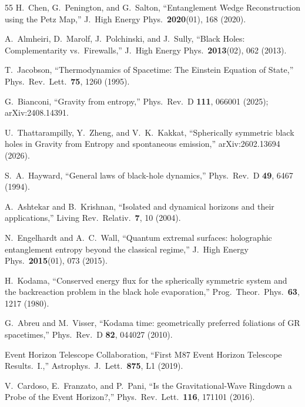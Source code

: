 \documentclass[prl,twocolumn,superscriptaddress,longbibliography,floatfix]{revtex4-2}
\begin{document}
\begin{thebibliography}{55}
H.~Chen, G.~Penington, and G.~Salton,
``Entanglement Wedge Reconstruction using the Petz Map,''
J.\ High Energy Phys.\ \textbf{2020}(01), 168 (2020).

A.~Almheiri, D.~Marolf, J.~Polchinski, and J.~Sully,
``Black Holes: Complementarity vs.\ Firewalls,''
J.\ High Energy Phys.\ \textbf{2013}(02), 062 (2013).


T.~Jacobson,
``Thermodynamics of Spacetime: The Einstein Equation of State,''
Phys.\ Rev.\ Lett.\ \textbf{75}, 1260 (1995).

G.~Bianconi,
``Gravity from entropy,''
Phys.\ Rev.\ D \textbf{111}, 066001 (2025);
arXiv:2408.14391.

U.~Thattarampilly, Y.~Zheng, and V.~K.~Kakkat,
``Spherically symmetric black holes in Gravity from Entropy
and spontaneous emission,''
arXiv:2602.13694 (2026).


S.~A.~Hayward,
``General laws of black-hole dynamics,''
Phys.\ Rev.\ D \textbf{49}, 6467 (1994).

A.~Ashtekar and B.~Krishnan,
``Isolated and dynamical horizons and their applications,''
Living Rev.\ Relativ.\ \textbf{7}, 10 (2004).

N.~Engelhardt and A.~C.~Wall,
``Quantum extremal surfaces: holographic entanglement
entropy beyond the classical regime,''
J.\ High Energy Phys.\ \textbf{2015}(01), 073 (2015).

H.~Kodama,
``Conserved energy flux for the spherically symmetric system
and the backreaction problem in the black hole evaporation,''
Prog.\ Theor.\ Phys.\ \textbf{63}, 1217 (1980).

G.~Abreu and M.~Visser,
``Kodama time: geometrically preferred foliations of GR
spacetimes,''
Phys.\ Rev.\ D \textbf{82}, 044027 (2010).


Event Horizon Telescope Collaboration,
``First M87 Event Horizon Telescope Results.\ I.,''
Astrophys.\ J.\ Lett.\ \textbf{875}, L1 (2019).

V.~Cardoso, E.~Franzato, and P.~Pani,
``Is the Gravitational-Wave Ringdown a Probe of the Event
Horizon?,''
Phys.\ Rev.\ Lett.\ \textbf{116}, 171101 (2016).


\end{thebibliography}
\end{document}
